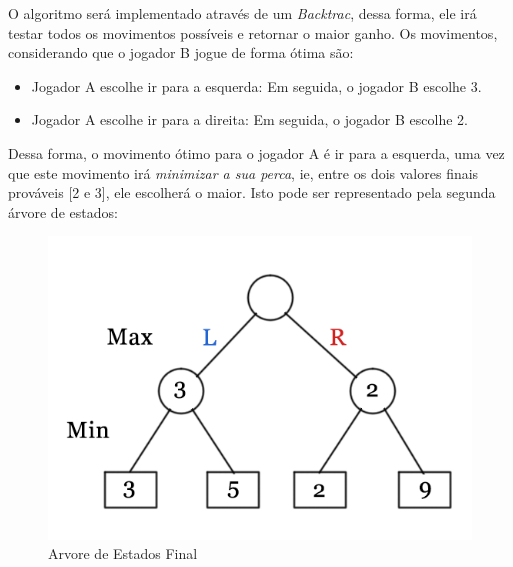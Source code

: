 \documentclass[]{article}
\begin{document}
	O algoritmo será implementado através de um \textit{Backtrac}, dessa forma, ele irá testar todos os movimentos possíveis e retornar o maior ganho. Os movimentos, considerando que o jogador B jogue de forma ótima são:
	\begin{itemize}
		\item Jogador A escolhe ir para a esquerda: Em seguida, o jogador B escolhe 3.
		\item Jogador A escolhe ir para a direita: Em seguida, o jogador B escolhe 2.
	\end{itemize}
	Dessa forma, o movimento ótimo para o jogador A é ir para a esquerda, uma vez que este movimento irá \emph{minimizar a sua perca}, ie, entre os dois valores finais prováveis [2 e 3], ele escolherá o maior. Isto pode ser representado pela segunda árvore de estados:
	\begin{figure}[H]
	   \includegraphics[width=\linewidth]{gtt2.png}
	   \caption{Arvore de Estados Final\cite{gfg}}
	   \label{fig:arvore2}
	\end{figure}
	
	
	
\end{document}
